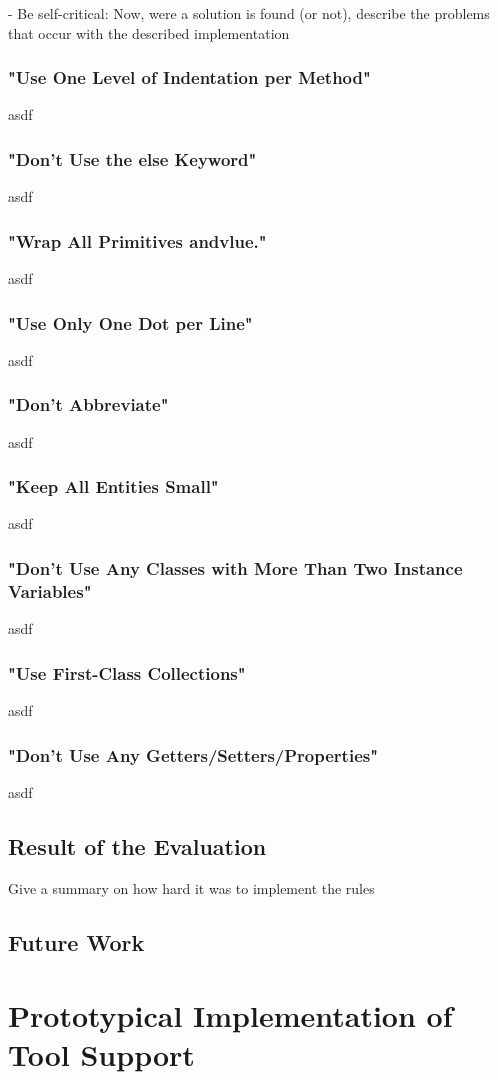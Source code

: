  - Be self-critical: Now, were a solution is found (or not), describe the problems that occur with the described implementation

\subsection{"Use One Level of Indentation per Method"}
asdf
\subsection{"Don’t Use the else Keyword"}
asdf
\subsection{"Wrap All Primitives andvlue."}
asdf
\subsection{"Use Only One Dot per Line"}
asdf
\subsection{"Don't Abbreviate"}
asdf
\subsection{"Keep All Entities Small"}
asdf
\subsection{"Don’t Use Any Classes with More Than Two Instance Variables"}
asdf
\subsection{"Use First-Class Collections"}
asdf
\subsection{"Don’t Use Any Getters/Setters/Properties"}
asdf
\section{Result of the Evaluation}
Give a summary on how hard it was to implement the rules
\section{Future Work}

\chapter{Prototypical Implementation of Tool Support}
